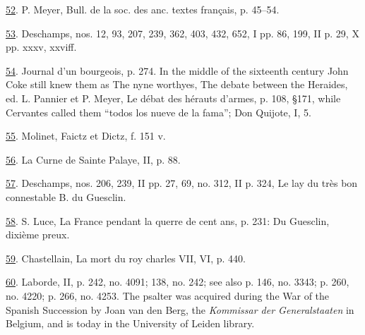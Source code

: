 \protect\hypertarget{23_NOTES.xhtmlux5cux23id_1830}{\protect\hyperlink{10_Chapter_Three__THE_HEROIC_DREAM.xhtmlux5cux23id_1829}{52}}.
P. Meyer, Bull. de la soc. des anc. textes français, p. 45--54.

\protect\hypertarget{23_NOTES.xhtmlux5cux23id_1828}{\protect\hyperlink{10_Chapter_Three__THE_HEROIC_DREAM.xhtmlux5cux23id_1827}{53}}.
Deschamps, nos. 12, 93, 207, 239, 362, 403, 432, 652, I pp. 86, 199, II
p. 29, X pp. xxxv, xxviff.

\protect\hypertarget{23_NOTES.xhtmlux5cux23id_1826}{\protect\hyperlink{10_Chapter_Three__THE_HEROIC_DREAM.xhtmlux5cux23id_1825}{54}}.
Journal d'un bourgeois, p. 274. In the middle of the sixteenth century
John Coke still knew them as The nyne worthyes, The debate between the
Heraides, ed. L. Pannier et P. Meyer, Le débat des hérauts d'armes, p.
108, §171, while Cervantes called them ``todos los nueve de la fama'';
Don Quijote, I, 5.

\protect\hypertarget{23_NOTES.xhtmlux5cux23id_1824}{\protect\hyperlink{10_Chapter_Three__THE_HEROIC_DREAM.xhtmlux5cux23id_1823}{55}}.
Molinet, Faictz et Dictz, f. 151 v.

\protect\hypertarget{23_NOTES.xhtmlux5cux23id_1822}{\protect\hyperlink{10_Chapter_Three__THE_HEROIC_DREAM.xhtmlux5cux23id_1821}{56}}.
La Curne de Sainte Palaye, II, p. 88.

\protect\hypertarget{23_NOTES.xhtmlux5cux23id_1820}{\protect\hyperlink{10_Chapter_Three__THE_HEROIC_DREAM.xhtmlux5cux23id_1819}{57}}.
Deschamps, nos. 206, 239, II pp. 27, 69, no. 312, II p. 324, Le lay du
très bon connestable B. du Guesclin.

\protect\hypertarget{23_NOTES.xhtmlux5cux23id_1818}{\protect\hyperlink{10_Chapter_Three__THE_HEROIC_DREAM.xhtmlux5cux23id_1817}{58}}.
S. Luce, La France pendant la querre de cent ans, p. 231: Du Guesclin,
dixième preux.

\protect\hypertarget{23_NOTES.xhtmlux5cux23id_1816}{\protect\hyperlink{10_Chapter_Three__THE_HEROIC_DREAM.xhtmlux5cux23id_1815}{59}}.
Chastellain, La mort du roy charles VII, VI, p. 440.

\protect\hypertarget{23_NOTES.xhtmlux5cux23id_1814}{\protect\hyperlink{10_Chapter_Three__THE_HEROIC_DREAM.xhtmlux5cux23id_1813}{60}}.
Laborde, II, p. 242, no. 4091; 138, no. 242; see also p. 146, no. 3343;
p. 260, no. 4220; p. 266, no. 4253. The psalter was acquired during the
War of the Spanish Succession by Joan van den Berg, the \emph{Kommissar
der Generalstaaten} in Belgium, and is today in the University of Leiden
library.

